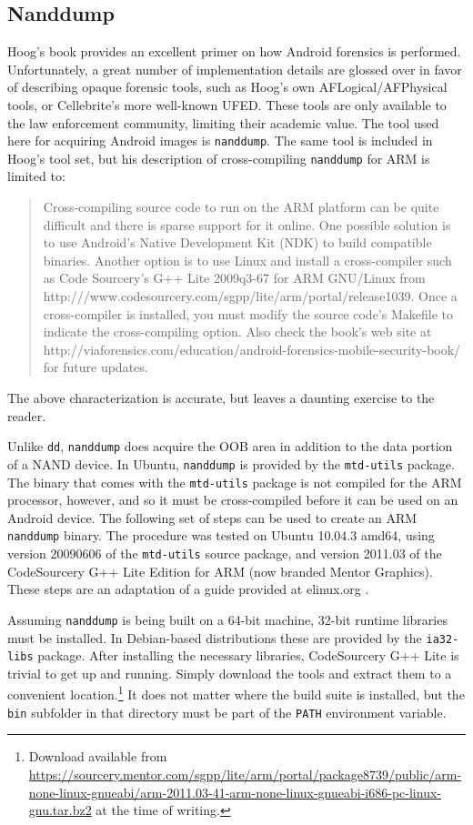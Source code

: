 \subsection{Nanddump}
Hoog's book \cite{hoog} provides an excellent primer on how Android forensics is performed.  Unfortunately, a great number of
implementation details are glossed over in favor of describing opaque forensic tools, such as Hoog's own AFLogical/AFPhysical tools,
or Cellebrite's more well-known UFED. These tools are only available to the law enforcement community, limiting their academic
value. The tool used here for acquiring Android images is \texttt{nanddump}. The same tool is included in Hoog's tool set, but his
description of cross-compiling \texttt{nanddump} for ARM is limited to: 
\begin{quote}
Cross-compiling source code to run on the ARM platform can be quite difficult and there is sparse support for it
online.  One possible solution is to use Android's Native Development Kit (NDK) to build compatible binaries.  Another option is to
use Linux and install a cross-compiler such as Code Sourcery's G++ Lite 2009q3-67 for ARM GNU/Linux from
http:///www.codesourcery.com/sgpp/lite/arm/portal/release1039.  Once a cross-compiler is installed, you must modify the source
code's Makefile to indicate the cross-compiling option.  Also check the book's web site at
http://viaforensics.com/education/android-forensics-mobile-security-book/ for future updates. \cite{hoog}
\end{quote}
The above characterization is accurate, but leaves a daunting exercise to the reader. 

Unlike \texttt{dd}, \texttt{nanddump} does acquire the OOB area in addition to the data portion of a NAND device.  In Ubuntu,
\texttt{nanddump} is provided by the \texttt{mtd-utils} package.  The binary that comes with the \texttt{mtd-utils} package is not
compiled for the ARM processor, however, and so it must be cross-compiled before it can be used on an Android device.  The following
set of steps can be used to create an ARM \texttt{nanddump} binary.  The procedure was tested on Ubuntu 10.04.3 amd64, using version
20090606 of the \texttt{mtd-utils} source package, and version 2011.03 of the CodeSourcery G++ Lite Edition for ARM (now branded
Mentor Graphics).  These steps are an adaptation of a guide provided at elinux.org \cite{compilingmtd}.

Assuming \texttt{nanddump} is being built on a 64-bit machine, 32-bit runtime libraries must be installed.  In Debian-based
distributions these are provided by the \texttt{ia32-libs} package.  After installing the necessary libraries, CodeSourcery G++ Lite
is trivial to get up and running.  Simply download the tools and extract them to a convenient location.\footnote{Download available
from
\url{https://sourcery.mentor.com/sgpp/lite/arm/portal/package8739/public/arm-none-linux-gnueabi/arm-2011.03-41-arm-none-linux-gnueabi-i686-pc-linux-gnu.tar.bz2}
at the time of writing.} It does not matter where the build suite is installed, but the \texttt{bin} subfolder in that directory
must be part of the \texttt{PATH} environment variable.

